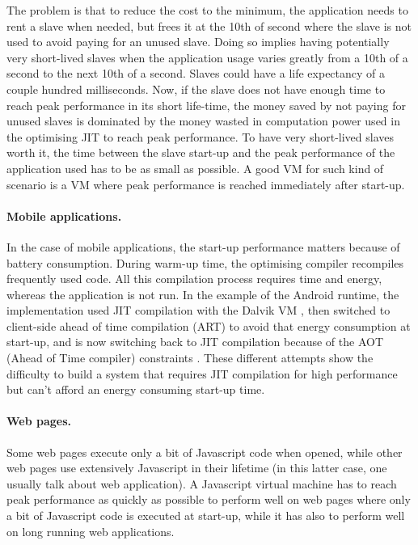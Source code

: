 \documentclass[a4paper,12pt,twoside]{../includes/ThesisStyle}
\begin{document}
The problem is that to reduce the cost to the minimum, the application needs to rent a slave when needed, but frees it at the 10th of second where the slave is not used to avoid paying for an unused slave. Doing so implies having potentially very short-lived slaves when the application usage varies greatly from a 10th of a second to the next 10th of a second. Slaves could have a life expectancy of a couple hundred milliseconds. Now, if the slave does not have enough time to reach peak performance in its short life-time, the money saved by not paying for unused slaves is dominated by the money wasted in computation power used in the optimising JIT to reach peak performance. To have very short-lived slaves worth it, the time between the slave start-up and the peak performance of the application used has to be as small as possible. A good VM for such kind of scenario is a VM where peak performance is reached immediately after start-up.

\paragraph{Mobile applications.}
In the case of mobile applications, the start-up performance matters because of battery consumption. During warm-up time, the optimising compiler recompiles frequently used code. All this compilation process requires time and energy, whereas the application is not run. In the example of the Android runtime, the implementation used JIT compilation with the Dalvik VM \cite{Born08a}, then switched to client-side ahead of time compilation (ART) to avoid that energy consumption at start-up, and is now switching back to JIT compilation because of the AOT (Ahead of Time compiler) constraints \cite{Geof15a}. These different attempts show the difficulty to build a system that requires JIT compilation for high performance but can't afford an energy consuming start-up time.

\paragraph{Web pages.}
Some web pages execute only a bit of Javascript code when opened, while other web pages use extensively Javascript in their lifetime (in this latter case, one usually talk about web application). A Javascript virtual machine has to reach peak performance as quickly as possible to perform well on web pages where only a bit of Javascript code is executed at start-up, while it has also to perform well on long running web applications.
\end{document}
